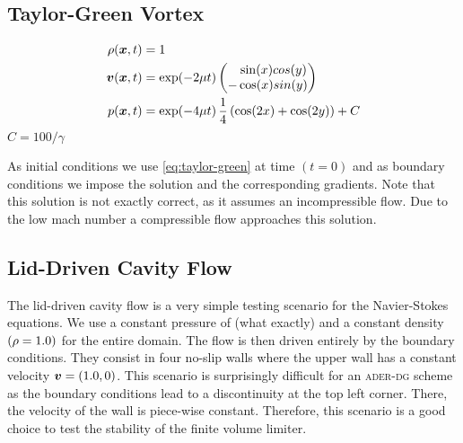 \subsection{Taylor-Green Vortex}
\begin{align}
  \label{eq:taylor-green}
  \begin{split}
  \rho(\bm{x}, t) &= 1\\
  \bm{v}(\bm{x}, t) &= \exp(-2 \mu t)
  \begin{pmatrix}
    \phantom{-}\sin(x) cos(y) \\
- \cos(x) sin(y) 
    \end{pmatrix} \\
  p(\bm{x}, t) &= \exp(-4 \mu t) \, \frac{1}{4} \left( \cos(2x) + \cos(2y) \right) + C
  \end{split}
\end{align}
$C = 100/\gamma$ \cite{dumbser2016high}

As initial conditions we use \cref{eq:taylor-green} at time $(t = 0)$ and as boundary conditions we impose the solution and the corresponding gradients.
Note that this solution is not exactly correct, as it assumes an incompressible flow.
Due to the low mach number a compressible flow approaches this solution.

\subsection{Lid-Driven Cavity Flow}
The lid-driven cavity flow is a very simple testing scenario for the Navier-Stokes equations.
We use a constant pressure of (what exactly) and a constant density $(\rho = 1.0)$ for the entire domain.
The flow is then driven entirely by the boundary conditions.
They consist in four no-slip walls where the upper wall has a constant velocity $\bm{v} = (1.0, 0)$.
This scenario is surprisingly difficult for an \textsc{ader-dg} scheme as the boundary conditions lead to a discontinuity at the top left corner.
There, the velocity of the wall is piece-wise constant.
Therefore, this scenario is a good choice to test the stability of the finite volume limiter.

